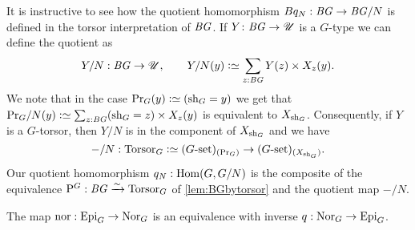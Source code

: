 \begin{remark}
It is instructive to see how the quotient homomorphism $Bq_N:\mathit{B}\mathit{G}\to \mathit{B}\mathit{G}/N$ is defined in the torsor interpretation of $\mathit{B}\mathit{G}$.  If $Y\colon \mathit{B}\mathit{G}\to{\mathscr{U}}$ is a $G$-type we can define the quotient as
$$
Y/N:\BG\to\UU,\qquad Y/N(y)\defequi\sum_{z:\BG}Y(z)\times X_z(y).
$$
We note that in the case $\princ G(y)\defequi (\sh_G=y)$ we get
that
$
\princ G /N(y)\defequi\sum_{z:\BG}(\sh_G=z)\times X_z(y)
$
is equivalent to $X_{\mathrm{sh}_G}$.  Consequently, if $Y$ is a $G$-torsor, then $Y/N$ is in the component of $X_{\mathrm{sh}_G}$ and we have
$$-/N:\typetorsor_G\defequi (G\text{-set})_{(\princ G)}\to (G\text{-set})_{(X_{\sh_G})}.
$$ Our quotient homomorphism $q_N:\Hom(G,G/N)$ is the composite of the equivalence $\mathrm{P}_{\!}^G:\mathit{B}\mathit{G}\xrightarrow{\sim}\mathrm{Torsor}_G$ of \cref{lem:BGbytorsor} and the quotient map $-/N$.
\end{remark}
\begin{lemma}
  \label{lem:qeq}
  The map $\nor:\typeepi_G\to\typenormal_G$ is an equivalence with inverse $q:\mathrm{Nor}_G\to\mathrm{Epi}_G$.
\end{lemma}
